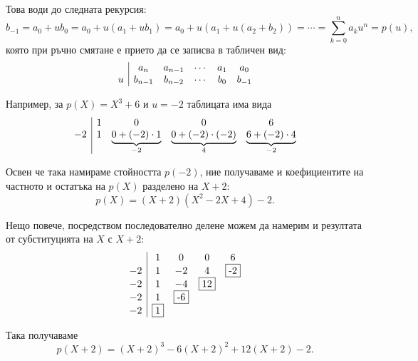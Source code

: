 \documentclass{../../common/topic}
\begin{document}
Това води до следната рекурсия:
\begin{equation}\label{eq:horners_rule/recursion}
  b_{-1} = a_0 + u b_0 = a_0 + u (a_1 + u b_1) = a_0 + u (a_1 + u (a_2 + b_2)) = \cdots = \sum_{k=0}^n a_k u^n = p(u),
\end{equation}
която при ръчно смятане е прието да се записва в табличен вид:
\begin{equation*}
  \begin{array}{c | c c c c c}
      & a_n     & a_{n-1} & \cdots & a_1 & a_0 \\
    u & b_{n-1} & b_{n-2} & \cdots & b_0 & b_{-1}
  \end{array}
\end{equation*}

Например, за \( p(X) = X^3 + 6 \) и \( u = -2 \) таблицата има вида
\begin{equation*}
  \begin{array}{c | c c c c}
       & 1 & 0                                  & 0                                  & 6 \\
    -2 & 1 & \underbrace{0 + (-2) \cdot 1}_{-2} & \underbrace{0 + (-2) \cdot (-2)}_4 & \underbrace{6 + (-2) \cdot 4}_{-2}
  \end{array}
\end{equation*}

Освен че така намираме стойността \( p(-2) \), ние получаваме и коефициентите на частното и остатъка на \( p(X) \) разделено на \( X + 2 \):
\begin{equation*}
  p(X) = (X + 2)(X^2 - 2X + 4) - 2.
\end{equation*}

Нещо повече, посредством последователно делене можем да намерим и резултата от субституцията на \( X \) с \( X + 2 \):
\begin{equation*}
  \begin{array}{c | c c c c}
       & 1        & 0         & 0         & 6         \\
    -2 & 1        & -2        & 4         & \fbox{-2} \\
    -2 & 1        & -4        & \fbox{12} &           \\
    -2 & 1        & \fbox{-6} &           &           \\
    -2 & \fbox{1} &           &           &           \\
  \end{array}
\end{equation*}

Така получаваме
\begin{equation*}
  p(X + 2) = (X + 2)^3 - 6(X + 2)^2 + 12(X + 2) - 2.
\end{equation*}
\end{document}
